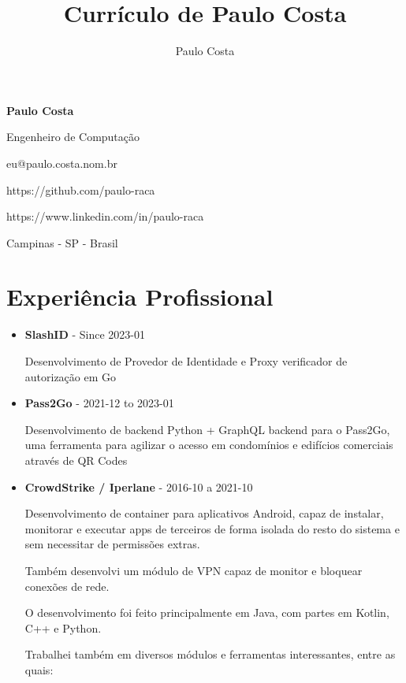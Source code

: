 \documentclass[a4paper,10pt]{article}
\title{Currículo de Paulo Costa}
\author{Paulo Costa}
\begin{document}
  
  \LARGE\textbf{Paulo Costa}

  \large Engenheiro de Computação

  \large eu@paulo.costa.nom.br

  \large https://github.com/paulo-raca

  \large https://www.linkedin.com/in/paulo-raca


  \large Campinas - SP - Brasil

  \normalsize 

  \section{Experiência Profissional}
    \begin{itemize}
      \item
        \textbf{SlashID} - Since 2023-01

        Desenvolvimento de Provedor de Identidade e Proxy verificador de autorização em Go

      \item
        \textbf{Pass2Go} - 2021-12 to 2023-01

        Desenvolvimento de backend Python + GraphQL backend para o Pass2Go, uma ferramenta para agilizar o acesso em condomínios e edifícios comerciais através de QR Codes

      \item
        \textbf{CrowdStrike / Iperlane} - 2016-10 a 2021-10

        Desenvolvimento de container para aplicativos Android, capaz de instalar, monitorar e executar
        apps de terceiros de forma isolada do resto do sistema e sem necessitar de permissões extras.

        Também desenvolvi um módulo de VPN capaz de monitor e bloquear conexões de rede.

        O desenvolvimento foi feito principalmente em Java, com partes em Kotlin, C++ e Python.

        Trabalhei também em diversos módulos e ferramentas interessantes, entre as quais:


\end{itemize}
\end{document}
